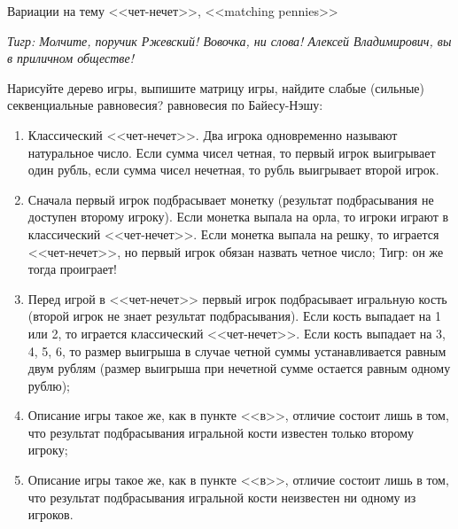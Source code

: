 \begin{problem}
 Вариации на тему <<чет-нечет>>, <<matching pennies>>\par
{\it Тигр: Молчите, поручик Ржевский!  {\red Вовочка, ни слова! Алексей Владимирович, вы в приличном обществе!}}\par
Нарисуйте дерево игры, выпишите матрицу игры, найдите {\red слабые (сильные) секвенциальные равновесия?}  равновесия по Байесу-Нэшу:\par
\begin{enumerate}
\item Классический <<чет-нечет>>. Два игрока одновременно называют натуральное число. Если сумма чисел четная, то первый игрок выигрывает один рубль, если сумма чисел нечетная, то рубль выигрывает второй игрок.\par
\item Сначала первый игрок подбрасывает монетку (результат подбрасывания не доступен второму игроку). Если монетка выпала на орла, то игроки играют в классический <<чет-нечет>>. Если монетка выпала на решку, то играется <<чет-нечет>>, но первый игрок обязан назвать четное число; {\red Тигр: он же тогда проиграет!}
\item  Перед игрой в <<чет-нечет>> первый игрок подбрасывает игральную кость (второй игрок не знает результат подбрасывания). Если кость выпадает на 1 или 2, то играется классический <<чет-нечет>>. Если кость выпадает на 3, 4, 5, 6, то размер выигрыша в случае четной суммы устанавливается равным двум рублям (размер выигрыша при нечетной сумме остается равным одному рублю);\par
\item Описание игры такое же, как в пункте <<в>>, отличие состоит лишь в том, что результат подбрасывания игральной кости известен только второму игроку;\par
\item Описание игры такое же, как в пункте <<в>>, отличие состоит лишь в том, что результат подбрасывания игральной кости неизвестен ни одному из игроков.
\end{enumerate}


\begin{sol}

\end{sol}
\end{problem}






